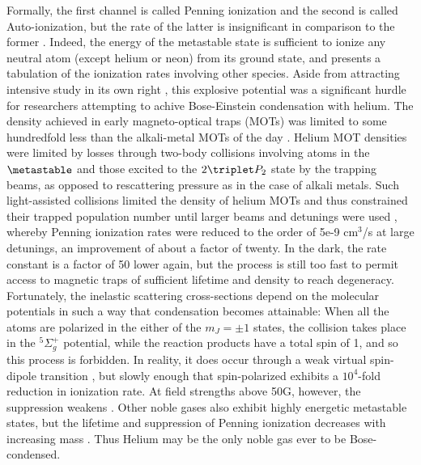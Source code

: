 	Formally, the first channel is called Penning ionization and the second is called Auto-ionization, but the rate of the latter is insignificant in comparison to the former \cite{Muller91}.  Indeed, the energy of the metastable state is sufficient to ionize any neutral atom (except helium or neon) from its ground state, and \cite{bell68} presents a tabulation of the ionization rates involving other species. Aside from attracting intensive study in its own right \cite{partridge10,stas06,mcnamara07}, this explosive potential was a significant hurdle for researchers attempting to achive Bose-Einstein condensation with helium. The density achieved in early magneto-optical traps (MOTs) was limited to some hundredfold less than the alkali-metal MOTs of the day \cite{bardou92,kumukura92,mastwijk98}. Helium MOT densities were limited by losses through two-body collisions involving atoms in the $\metastable$ and those excited to the $2\triplet P_2$ state by the trapping beams, as opposed to rescattering pressure as in the case of alkali metals. Such light-assisted collisions limited the density of helium MOTs and thus constrained their trapped population  number until larger beams and detunings were used \cite{tol99}, whereby Penning ionization rates were reduced to the order of 5e-9 cm$^3$/s at large detunings, an improvement of about a factor of twenty. In the dark, the rate constant is a factor of 50 lower again, but the process is  still too fast to permit access to magnetic traps of sufficient lifetime and density to reach degeneracy. Fortunately, the inelastic scattering cross-sections depend on the molecular potentials in such a way that condensation becomes attainable: When all the atoms are polarized in the either of the $m_J=\pm1$ states, the collision takes place in the $^5\Sigma_g^+$ potential, while the reaction products have a total spin of 1, and so this process is forbidden. In reality, it does occur through a weak virtual spin-dipole transition \cite{shlyapnikov94} , but slowly enough that spin-polarized \mhe exhibits a $10^4$-fold reduction in ionization rate. At field strengths above 50G, however, the suppression weakens \cite{shlyapnikov94,Borbely12}. Other noble gases also exhibit highly energetic metastable states, but the lifetime and suppression of Penning ionization decreases with increasing mass \cite{orzel99, spoden05}. Thus Helium may be the only noble gas ever to be Bose-condensed. 

